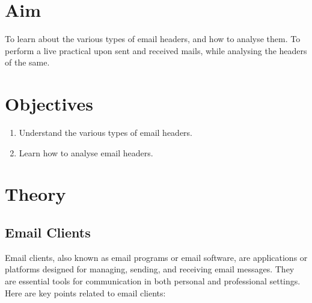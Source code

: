 \documentclass[11pt]{article}
\begin{document}
\tableofcontents
\thispagestyle{empty}
\clearpage

\setcounter{page}{1}

\section{Aim}
To learn about the various types of email headers, and how to analyse them. To perform a live practical upon sent and received mails, while analysing the headers of the same.

\section{Objectives}
\begin{enumerate}
    \item Understand the various types of email headers.
    \item Learn how to analyse email headers.
\end{enumerate}

\section{Theory}

\subsection{Email Clients}

Email clients, also known as email programs or email software, are applications or platforms designed for managing, sending, and receiving email messages. They are essential tools for communication in both personal and professional settings. Here are key points related to email clients:
\end{document}

